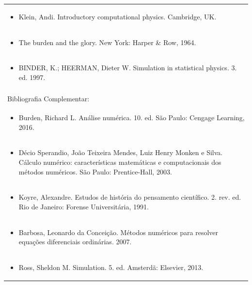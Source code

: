 \documentclass[11pt]{article}
\begin{document}
\begin{center}
\begin{longtable}{|p{4cm}|p{4cm}|p{4cm}|p{4cm}|}
\multicolumn{4}{|p{\dimexpr 16cm + 6\tabcolsep\relax}|}{\begin{itemize}\item Klein, Andi. Introductory computational physics. Cambridge, UK.\end{itemize}}\\
\multicolumn{4}{|p{\dimexpr 16cm + 6\tabcolsep\relax}|}{\begin{itemize}\item The burden and the glory. New York: Harper \& Row, 1964.\end{itemize}}\\
\multicolumn{4}{|p{\dimexpr 16cm + 6\tabcolsep\relax}|}{\begin{itemize}\item BINDER, K.; HEERMAN, Dieter W. Simulation in statistical physics. 3. ed. 1997.\end{itemize}}\\
\multicolumn{4}{|p{16cm}|}{}\\
\hline
\multicolumn{4}{|p{16cm}|}{Bibliografia Complementar:}\\*
\multicolumn{4}{|p{\dimexpr 16cm + 6\tabcolsep\relax}|}{\begin{itemize}\item Burden, Richard L. Análise numérica. 10. ed. São Paulo: Cengage Learning, 2016.\end{itemize}}\\
\multicolumn{4}{|p{\dimexpr 16cm + 6\tabcolsep\relax}|}{\begin{itemize}\item Décio Sperandio, João Teixeira Mendes, Luiz Henry Monken e Silva. Cálculo numérico: características matemáticas e computacionais dos métodos numéricos. São Paulo: Prentice-Hall, 2003.\end{itemize}}\\
\multicolumn{4}{|p{\dimexpr 16cm + 6\tabcolsep\relax}|}{\begin{itemize}\item Koyre, Alexandre. Estudos de história do pensamento científico. 2. rev. ed. Rio de Janeiro: Forense Universitária, 1991.\end{itemize}}\\
\multicolumn{4}{|p{\dimexpr 16cm + 6\tabcolsep\relax}|}{\begin{itemize}\item Barbosa, Leonardo da Conceição. Métodos numéricos para resolver equações diferenciais ordinárias. 2007.\end{itemize}}\\
\multicolumn{4}{|p{\dimexpr 16cm + 6\tabcolsep\relax}|}{\begin{itemize}\item Ross, Sheldon M. Simulation. 5. ed. Amsterdã: Elsevier, 2013.\end{itemize}}\\
\hline
\end{longtable}
\end{center}
\end{document}
